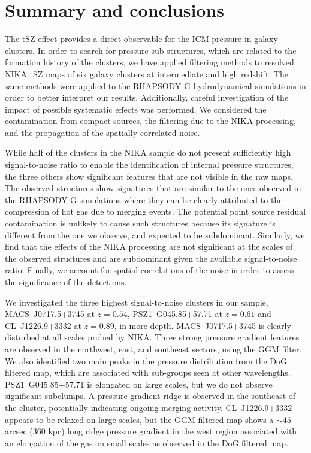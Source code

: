 \documentclass[twocolumn,traditabstract]{aa}
\begin{document}
\section{Summary and conclusions}\label{sec:Summary_and_conclusions}
The tSZ effect provides a direct observable for the ICM pressure in galaxy clusters. In order to search for pressure sub-structures, which are related to the formation history of the clusters, we have applied filtering methods to resolved NIKA tSZ maps of six galaxy clusters at intermediate and high redshift. The same methods were applied to the RHAPSODY-G hydrodynamical simulations in order to better interpret our results. Additionally, careful investigation of the impact of possible systematic effects was performed. We considered the contamination from compact sources, the filtering due to the NIKA processing, and the propagation of the spatially correlated noise.

While half of the clusters in the NIKA sample do not present sufficiently high signal-to-noise ratio to enable the identification of internal pressure structures, the three others show significant features that are not visible in the raw maps. The observed structures show signatures that are similar to the ones observed in the RHAPSODY-G simulations where they can be clearly attributed to the compression of hot gas due to merging events. The potential point source residual contamination is unlikely to cause such structures because its signature is different from the one we observe, and expected to be subdominant. Similarly, we find that the effects of the NIKA processing are not significant at the scales of the observed structures and are subdominant given the available signal-to-noise ratio. Finally, we account for spatial correlations of the noise in order to assess the significance of the detections.

We investigated the three highest signal-to-noise clusters in our sample, \mbox{MACS~J0717.5+3745} at $z=0.54$, \mbox{PSZ1~G045.85+57.71} at $z=0.61$ and \mbox{CL~J1226.9+3332} at $z=0.89$, in more depth. \mbox{MACS~J0717.5+3745} is clearly disturbed at all scales probed by NIKA. Three strong pressure gradient features are observed in the northwest, east, and southeast sectors, using the GGM filter. We also identified two main peaks in the pressure distribution from the DoG filtered map, which are associated with sub-groups seen at other wavelengths. \mbox{PSZ1~G045.85+57.71} is elongated on large scales, but we do not observe significant subclumps. A pressure gradient ridge is observed in the southeast of the cluster, potentially indicating ongoing merging activity. \mbox{CL~J1226.9+3332} appears to be relaxed on large scales, but the GGM filtered map shows a $\sim 45$ arcsec (360 kpc) long ridge pressure gradient in the west region associated with an elongation of the gas on small scales as observed in the DoG filtered map.
\end{document}
